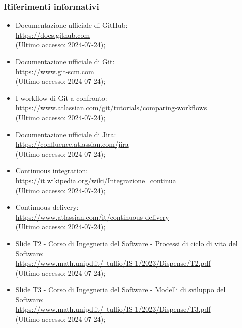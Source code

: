 \subsubsection{Riferimenti informativi}
\begin{itemize}
  \item Documentazione ufficiale di GitHub: \\ \href{https://docs.github.com}{https://docs.github.com}  \\ (Ultimo accesso: 2024-07-24);
  \item Documentazione ufficiale di Git: \\ \href{https://www.git-scm.com}{https://www.git-scm.com}  \\ (Ultimo accesso: 2024-07-24);
  \item I workflow di Git a confronto: \\ \href{https://www.atlassian.com/git/tutorials/comparing-workflows}{https://www.atlassian.com/git/tutorials/comparing-workflows}  \\ (Ultimo accesso: 2024-07-24);
  \item Documentazione ufficiale di Jira: \\ \href{https://confluence.atlassian.com/jira}{https://confluence.atlassian.com/jira}  \\ (Ultimo accesso: 2024-07-24);
  \item Continuous integration: \\ \href{https://it.wikipedia.org/wiki/Integrazionecontinua}{https://it.wikipedia.org/wiki/Integrazione\_continua}  \\ (Ultimo accesso: 2024-07-24);
  \item Continuous delivery: \\ \href{https://www.atlassian.com/it/continuous-delivery}{https://www.atlassian.com/it/continuous-delivery}  \\ (Ultimo accesso: 2024-07-24);
  \item Slide T2 - Corso di Ingegneria del Software - Processi di ciclo di vita del Software: \\ \href{https://www.math.unipd.it/~tullio/IS-1/2023/Dispense/T2.pdf}{https://www.math.unipd.it/~tullio/IS-1/2023/Dispense/T2.pdf}  \\ (Ultimo accesso: 2024-07-24);
  \item Slide T3 - Corso di Ingegneria del Software - Modelli di sviluppo del Software: \\ \href{https://www.math.unipd.it/~tullio/IS-1/2023/Dispense/T3.pdf}{https://www.math.unipd.it/~tullio/IS-1/2023/Dispense/T3.pdf}  \\ (Ultimo accesso: 2024-07-24);

\end{itemize}
